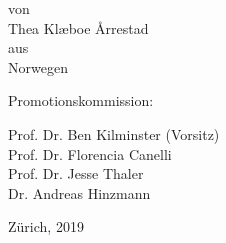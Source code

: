 \begin{center}

\vspace{0.2in}
von \\
\vspace{0.05in}
{\large Thea Kl\ae boe \AA rrestad} \\
aus \\
Norwegen \\
\par
\vspace{0.2in}


Promotionskommission:\\
\par
\vspace{0.1in}


Prof. Dr. Ben Kilminster (Vorsitz)\\
Prof. Dr. Florencia Canelli\\
Prof. Dr. Jesse Thaler\\
Dr. Andreas Hinzmann\\

\par
\vspace{0.2in}


Z\"urich, 2019

\end{center}
